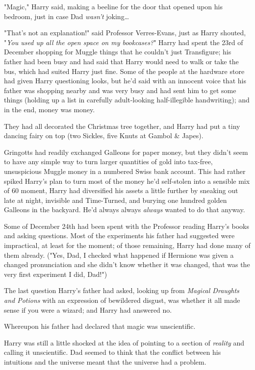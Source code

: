 "Magic," Harry said, making a beeline for the door that opened upon his 
bedroom, just in case Dad \emph{wasn't} joking{\ldots}

"That's not an explanation!" said Professor Verres-Evans, just as Harry 
shouted, "\emph{You used up all the open space on my bookcases?}"
\sbreak
Harry had spent the 23rd of December shopping for Muggle things that he 
couldn't just Transfigure; his father had been busy and had said that Harry 
would need to walk or take the bus, which had suited Harry just fine. Some of 
the people at the hardware store had given Harry questioning looks, but he'd 
said with an innocent voice that his father was shopping nearby and was very 
busy and had sent him to get some things (holding up a list in carefully 
adult-looking half-illegible handwriting); and in the end, money was money.

They had all decorated the Christmas tree together, and Harry had put a tiny 
dancing fairy on top (two Sickles, five Knuts at Gambol & Japes).

Gringotts had readily exchanged Galleons for paper money, but they didn't seem 
to have any simple way to turn larger quantities of gold into tax-free, 
unsuspicious Muggle money in a numbered Swiss bank account. This had rather 
spiked Harry's plan to turn most of the money he'd self-stolen into a sensible 
mix of 60%
moment, Harry had diversified his assets a little further by sneaking out late 
at night, invisible and Time-Turned, and burying one hundred golden Galleons in 
the backyard. He'd always always \emph{always} wanted to do that anyway.

Some of December 24th had been spent with the Professor reading Harry's books 
and asking questions. Most of the experiments his father had suggested were 
impractical, at least for the moment; of those remaining, Harry had done many 
of them already. ("Yes, Dad, I checked what happened if Hermione was given a 
changed pronunciation and she didn't know whether it was changed, that was the 
very first experiment I did, Dad!")

The last question Harry's father had asked, looking up from \emph{Magical 
Draughts and Potions} with an expression of bewildered disgust, was whether it 
all made sense if you were a wizard; and Harry had answered no.

Whereupon his father had declared that magic was unscientific.

Harry was still a little shocked at the idea of pointing to a section of 
\emph{reality} and calling it unscientific. Dad seemed to think that the 
conflict between his intuitions and the universe meant that the universe had a 
problem.


